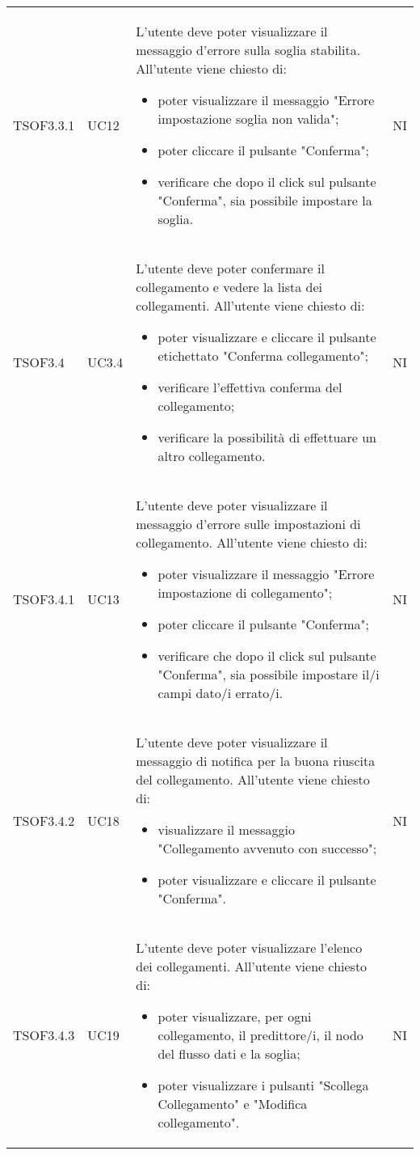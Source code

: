 \begin{longtable}{C{2.5cm} C{2.5cm} L{8cm} C{2cm}}
TSOF3.3.1 &
UC12 &
L'utente  deve poter visualizzare il messaggio d'errore sulla soglia stabilita. All'utente viene chiesto di:
\begin{itemize}
	\item poter visualizzare il messaggio "Errore impostazione soglia non valida";
	\item poter cliccare il pulsante "Conferma";
	\item verificare che dopo il click sul pulsante "Conferma", sia possibile impostare la soglia.
\end{itemize} &
NI \\

TSOF3.4 &
UC3.4 &
L'utente  deve poter confermare il collegamento e vedere la lista dei collegamenti. All'utente viene chiesto di:
\begin{itemize}
	\item poter visualizzare e cliccare il pulsante etichettato "Conferma collegamento";
	\item verificare l'effettiva conferma del collegamento;
	\item verificare la possibilità di effettuare un altro collegamento.
\end{itemize}&
NI \\

TSOF3.4.1 &
UC13 &
L'utente  deve poter visualizzare il messaggio d'errore sulle impostazioni di collegamento. All'utente viene chiesto di:
\begin{itemize}
	\item poter visualizzare il messaggio "Errore impostazione di collegamento";
	\item poter cliccare il pulsante "Conferma";
	\item verificare che dopo il click sul pulsante "Conferma", sia possibile impostare il/i campi dato/i errato/i.
\end{itemize}&
NI \\
TSOF3.4.2 &
UC18 &
L'utente  deve poter visualizzare il messaggio di notifica per la buona riuscita del collegamento. All'utente viene chiesto di:
\begin{itemize}
	\item visualizzare il messaggio "Collegamento avvenuto con successo";
	\item poter visualizzare e cliccare il pulsante "Conferma".
\end{itemize} &
NI \\

TSOF3.4.3 &
UC19 &
L'utente  deve poter visualizzare l'elenco dei collegamenti. All'utente viene chiesto di:
\begin{itemize}
	\item poter visualizzare, per ogni collegamento, il predittore/i, il nodo del flusso dati e la soglia;
	\item poter visualizzare i pulsanti "Scollega Collegamento" e "Modifica collegamento".
\end{itemize}&
NI \\


\end{longtable}
